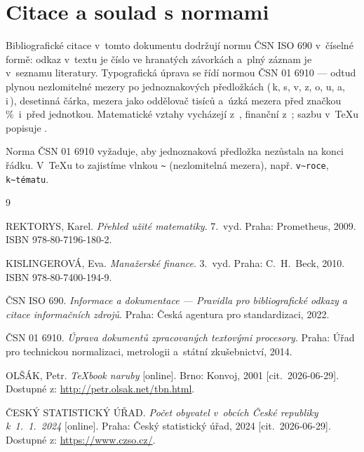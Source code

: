 \documentclass[11pt, a4paper, oneside]{book}
\begin{document}
\section{Citace a soulad s normami}

Bibliografické citace v~tomto dokumentu dodržují normu ČSN ISO 690
\cite{csniso690} v~číselné formě: odkaz v~textu je číslo ve hranatých
závorkách a~plný záznam je v~seznamu literatury. Typografická úprava se řídí
normou ČSN 01 6910 \cite{csn016910} — odtud plynou nezlomitelné mezery po
jednoznakových předložkách (\,k, s, v, z, o, u, a, i\,), desetinná čárka,
mezera jako oddělovač tisíců a~úzká mezera před značkou \%\ i~před jednotkou.
Matematické vztahy vycházejí z~\cite{rektorys}, finanční z~\cite{kislingerova};
sazbu v~\TeX{}u popisuje \cite{olsak}.

\begin{pozor}
Norma ČSN 01 6910 vyžaduje, aby jednoznaková předložka nezůstala na konci
řádku. V~\TeX{}u to zajistíme vlnkou \verb|~| (nezlomitelná mezera), např.
\verb|v~roce|, \verb|k~tématu|.
\end{pozor}

\begin{thebibliography}{9}

REKTORYS, Karel. \textit{Přehled užité matematiky}. 7.~vyd. Praha: Prometheus,
2009. ISBN 978-80-7196-180-2.

KISLINGEROVÁ, Eva. \textit{Manažerské finance}. 3.~vyd. Praha: C.~H.~Beck,
2010. ISBN 978-80-7400-194-9.

ČSN ISO 690. \textit{Informace a dokumentace --- Pravidla pro bibliografické
odkazy a citace informačních zdrojů}. Praha: Česká agentura pro standardizaci,
2022.

ČSN 01 6910. \textit{Úprava dokumentů zpracovaných textovými procesory}.
Praha: Úřad pro technickou normalizaci, metrologii a~státní zkušebnictví, 2014.

OLŠÁK, Petr. \textit{TeXbook naruby} [online]. Brno: Konvoj, 2001
[cit.~2026-06-29]. Dostupné z: \url{http://petr.olsak.net/tbn.html}.

ČESKÝ STATISTICKÝ ÚŘAD. \textit{Počet obyvatel v~obcích České republiky
k~1.~1.~2024} [online]. Praha: Český statistický úřad, 2024
[cit.~2026-06-29]. Dostupné z: \url{https://www.czso.cz/}.

\end{thebibliography}
\end{document}
